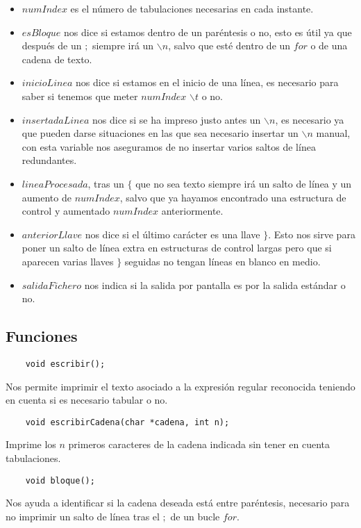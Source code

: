 \documentclass[11pt,spanish]{article} %
\begin{document}
\begin{itemize}
	\item $numIndex$ es el número de tabulaciones necesarias en cada instante.
	\item $esBloque$ nos dice si estamos dentro de un paréntesis o no, esto es útil ya que después de un $;$ siempre irá un $  \backslash n$, salvo que esté dentro de un $for$ o de una cadena de texto.
	\item $inicioLinea$ nos dice si estamos en el inicio de una línea, es necesario para saber si tenemos que meter $numIndex$ $\backslash t$ o no.
	\item $insertadaLinea$ nos dice si se ha impreso justo antes un $\backslash n$, es necesario ya que pueden darse situaciones en las que sea necesario insertar un $\backslash n$ manual, con esta variable nos aseguramos de no insertar varios saltos de línea redundantes.
	\item $lineaProcesada$, tras un $\{$ que no sea texto siempre irá un salto de línea y un aumento de $numIndex$, salvo que ya hayamos encontrado una estructura de control y aumentado $numIndex$ anteriormente.
	\item $anteriorLlave$ nos dice si el último carácter es una llave $\}$. Esto nos sirve para poner un salto de línea extra en estructuras de control largas pero que si aparecen varias llaves $\}$ seguidas no tengan líneas en blanco en medio.
	\item $salidaFichero$ nos indica si la salida por pantalla es por la salida estándar o no.
\end{itemize}

\subsection{Funciones}
\begin{lstlisting}
	void escribir();
\end{lstlisting}
Nos permite imprimir el texto asociado a la expresión regular reconocida teniendo en cuenta si es necesario tabular o no.


\vspace{0.5cm}
\begin{lstlisting}
	void escribirCadena(char *cadena, int n);
\end{lstlisting}
Imprime los $n$ primeros caracteres de la cadena indicada sin tener en cuenta tabulaciones.

\vspace{0.5cm}
\begin{lstlisting}
	void bloque();
\end{lstlisting}
Nos ayuda a identificar si la cadena deseada está entre paréntesis, necesario para no imprimir un salto de línea tras el $;$ de un bucle $for$.
\end{document}
